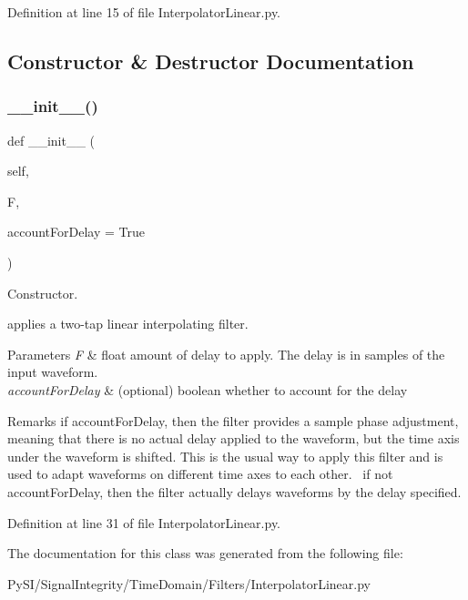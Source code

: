 Definition at line 15 of file Interpolator\+Linear.\+py.



\subsection{Constructor \& Destructor Documentation}
\mbox{\label{classSignalIntegrity_1_1TimeDomain_1_1Filters_1_1InterpolatorLinear_1_1FractionalDelayFilterLinear_a71162faa904c7ea2018b89ebba16c33d}} 
\subsubsection{\texorpdfstring{\+\_\+\+\_\+init\+\_\+\+\_\+()}{\_\_init\_\_()}}
{\footnotesize\ttfamily def \+\_\+\+\_\+init\+\_\+\+\_\+ (\begin{DoxyParamCaption}\item[{}]{self,  }\item[{}]{F,  }\item[{}]{account\+For\+Delay = {\ttfamily True} }\end{DoxyParamCaption})}



Constructor. 

applies a two-\/tap linear interpolating filter.


\begin{DoxyParams}{Parameters}
{\em F} & float amount of delay to apply. The delay is in samples of the input waveform. \\
\hline
{\em account\+For\+Delay} & (optional) boolean whether to account for the delay \\
\hline
\end{DoxyParams}
\begin{DoxyRemark}{Remarks}
if account\+For\+Delay, then the filter provides a sample phase adjustment, meaning that there is no actual delay applied to the waveform, but the time axis under the waveform is shifted. This is the usual way to apply this filter and is used to adapt waveforms on different time axes to each other.~\newline
 if not account\+For\+Delay, then the filter actually delays waveforms by the delay specified. 
\end{DoxyRemark}


Definition at line 31 of file Interpolator\+Linear.\+py.



The documentation for this class was generated from the following file\+:\begin{DoxyCompactItemize}
\item 
Py\+S\+I/\+Signal\+Integrity/\+Time\+Domain/\+Filters/Interpolator\+Linear.\+py\end{DoxyCompactItemize}
